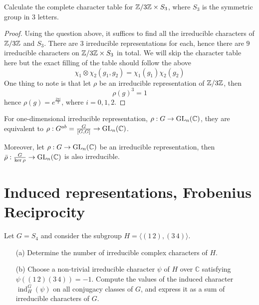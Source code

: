 \begin{prob}[S2001-Q3]
    Calculate the complete character table for $\mathbb{Z}/3\mathbb{Z}\times S_3$, where $S_3$ is the symmetric group in 3 letters.
\end{prob}
\begin{proof}
    Using the question above, it suffices to find all the irreducible characters of $\mathbb{Z}/3\mathbb{Z}$ and $S_3$. There are $3$ irreducible representations for each, hence there are $9$ irreducible characters on $\mathbb{Z}/3\mathbb{Z}\times S_3$ in total. We will skip the character table here but the exact filling of the table should follow the above 
    \begin{equation*}
        \chi_1\otimes\chi_2(g_1,g_2)=\chi_1(g_1)\chi_2(g_2)
    \end{equation*}
    One thing to note is that let $\rho$ be an  irreducible representation of $\mathbb{Z}/3\mathbb{Z}$, then 
    \begin{equation*}
        \rho(g)^3=1
    \end{equation*}
    hence $\rho(g)=e^\frac{2\pi i}{3}$, where $i=0,1,2$.
\end{proof}

\begin{warn}
    For one-dimensional irreducible representation, $\rho: G\to \text{GL}_n(\mathbb{C})$, they are equivalent to $\rho: G^{ab}=\frac{G}{[G,G]}\to\text{GL}_n(\mathbb{C})$.

    Moreover, let $\rho:G\to\text{GL}_n(\mathbb{C})$ be an irreducible  representation, then $\bar{\rho}:\frac{G}{\ker\rho}\to\text{GL}_n(\mathbb{C})$ is also irreducible.
\end{warn}
\section{Induced representations, Frobenius Reciprocity}


\begin{prob}[S2009-Q6]
    Let \( G = S_4 \) and consider the subgroup \( H = \langle (1\,2), (3\,4) \rangle \).
    
    \begin{enumerate}
        \item[(a)] Determine the number of irreducible complex characters of \( H \).
        
        \item[(b)] Choose a non-trivial irreducible character \( \psi \) of \( H \) over \( \mathbb{C} \) satisfying \( \psi((1\,2)(3\,4)) = -1 \). Compute the values of the induced character \( \operatorname{ind}_H^G(\psi) \) on all conjugacy classes of \( G \), and express it as a sum of irreducible characters of \( G \).
    \end{enumerate}
\end{prob}

